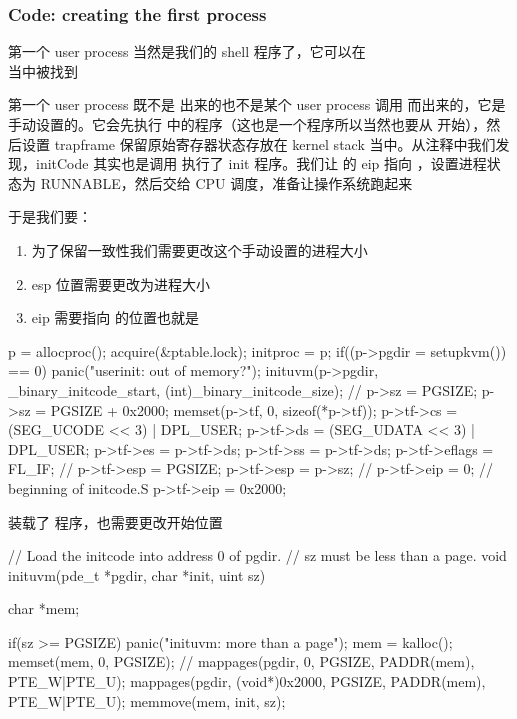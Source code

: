 \subsubsection{Code: creating the first process}

第一个 user process 当然是我们的 shell 程序了，它可以在 \\
 当中被找到

第一个 user process 既不是  出来的也不是某个 user process 调用  而出来的，它是手动设置的。它会先执行  中的程序（这也是一个程序所以当然也要从 开始），然后设置 trapframe 保留原始寄存器状态存放在 kernel stack 当中。从注释中我们发现，initCode 其实也是调用  执行了 init 程序。我们让  的 eip 指向 ，设置进程状态为 RUNNABLE，然后交给 CPU 调度，准备让操作系统跑起来

于是我们要：

\begin{enumerate}
    \item 为了保留一致性我们需要更改这个手动设置的进程大小
    \item esp 位置需要更改为进程大小
    \item eip 需要指向  的位置也就是 
\end{enumerate}

\begin{ccode}
    p = allocproc();
    acquire(&ptable.lock);
    initproc = p;
    if((p->pgdir = setupkvm()) == 0)
    panic("userinit: out of memory?");
    inituvm(p->pgdir, _binary_initcode_start, (int)_binary_initcode_size);
    // p->sz = PGSIZE;
    p->sz = PGSIZE + 0x2000;
    memset(p->tf, 0, sizeof(*p->tf));
    p->tf->cs = (SEG_UCODE << 3) | DPL_USER;
    p->tf->ds = (SEG_UDATA << 3) | DPL_USER;
    p->tf->es = p->tf->ds;
    p->tf->ss = p->tf->ds;
    p->tf->eflags = FL_IF;
    // p->tf->esp = PGSIZE;
    p->tf->esp = p->sz;
    // p->tf->eip = 0;  // beginning of initcode.S
    p->tf->eip = 0x2000;
\end{ccode}

 装载了  程序，也需要更改开始位置

\begin{ccode}
    // Load the initcode into address 0 of pgdir.
    // sz must be less than a page.
    void
    inituvm(pde_t *pgdir, char *init, uint sz)
    {
    char *mem;
    
    if(sz >= PGSIZE)
        panic("inituvm: more than a page");
    mem = kalloc();
    memset(mem, 0, PGSIZE);
    // mappages(pgdir, 0, PGSIZE, PADDR(mem), PTE_W|PTE_U);
    mappages(pgdir, (void*)0x2000, PGSIZE, PADDR(mem), PTE_W|PTE_U);
    memmove(mem, init, sz);
    }
\end{ccode}

